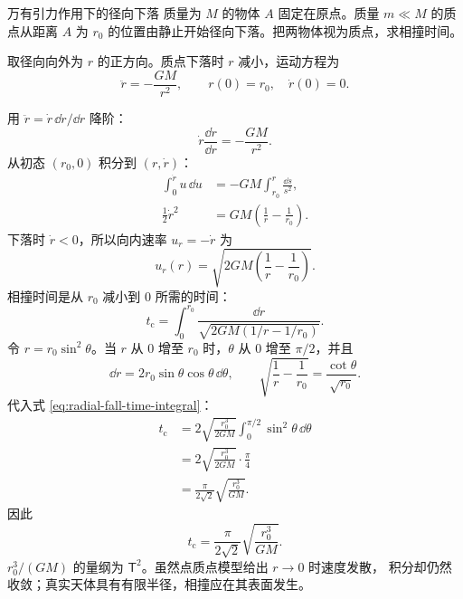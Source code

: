 \documentclass[UTF8,zihao=-4,oneside,openany]{ctexbook}
\begin{document}
\begin{examplebox}{万有引力作用下的径向下落}
质量为 $M$ 的物体 $A$ 固定在原点。质量 $m\ll M$ 的质点从距离 $A$ 为 $r_0$
的位置由静止开始径向下落。把两物体视为质点，求相撞时间。

\tcblower
取径向向外为 $r$ 的正方向。质点下落时 $r$ 减小，运动方程为
\begin{equation}
  \ddot r=-\frac{GM}{r^2},
  \qquad r(0)=r_0,\quad \dot r(0)=0.
  \label{eq:radial-fall-ode}
\end{equation}

\begin{center}
\end{center}

用 $\ddot r=\dot r\,\dd\dot r/\dd r$ 降阶：
\[
  \dot r\frac{\dd\dot r}{\dd r}=-\frac{GM}{r^2}.
\]
从初态 $(r_0,0)$ 积分到 $(r,\dot r)$：
\begin{align*}
  \int_0^{\dot r}\!u\,\dd u
  &=-GM\int_{r_0}^{r}\frac{\dd s}{s^2},\\
  \frac12\dot r^2
  &=GM\left(\frac1r-\frac1{r_0}\right).
\end{align*}
下落时 $\dot r<0$，所以向内速率 $u_r=-\dot r$ 为
\begin{equation}
  u_r(r)=\sqrt{2GM\left(\frac1r-\frac1{r_0}\right)}.
  \label{eq:radial-fall-speed}
\end{equation}
相撞时间是从 $r_0$ 减小到 $0$ 所需的时间：
\begin{equation}
  t_{\mathrm c}=\int_0^{r_0}
  \frac{\dd r}{\sqrt{2GM(1/r-1/r_0)}}.
  \label{eq:radial-fall-time-integral}
\end{equation}
令 $r=r_0\sin^2\theta$。当 $r$ 从 $0$ 增至 $r_0$ 时，$\theta$ 从 $0$ 增至
$\pi/2$，并且
\[
  \dd r=2r_0\sin\theta\cos\theta\,\dd\theta,
  \qquad
  \sqrt{\frac1r-\frac1{r_0}}
  =\frac{\cot\theta}{\sqrt{r_0}}.
\]
代入式 \eqref{eq:radial-fall-time-integral}：
\begin{align*}
  t_{\mathrm c}
  &=2\sqrt{\frac{r_0^3}{2GM}}
    \int_0^{\pi/2}\sin^2\theta\,\dd\theta\\
  &=2\sqrt{\frac{r_0^3}{2GM}}\cdot\frac\pi4\\
  &=\frac{\pi}{2\sqrt2}\sqrt{\frac{r_0^3}{GM}}.
\end{align*}
因此
\begin{equation}
  \boxed{t_{\mathrm c}=\frac{\pi}{2\sqrt2}
  \sqrt{\frac{r_0^3}{GM}}}.
  \label{eq:radial-fall-time}
\end{equation}
$r_0^3/(GM)$ 的量纲为 $\mathsf T^2$。虽然点质点模型给出 $r\to0$ 时速度发散，
积分却仍然收敛；真实天体具有有限半径，相撞应在其表面发生。
\end{examplebox}
\end{document}

